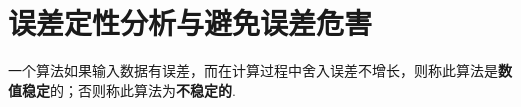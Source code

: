 \documentclass[../../main.tex]{subfiles}
\begin{document}
\section{误差定性分析与避免误差危害}

\begin{definition}
一个算法如果输入数据有误差，而在计算过程中舍入误差不增长，则称此算法是\textbf{数值稳定}的；否则称此算法为\textbf{不稳定的}.
\end{definition}

\begin{example}

\end{example}
\begin{solution}


\end{solution}
\end{document}
